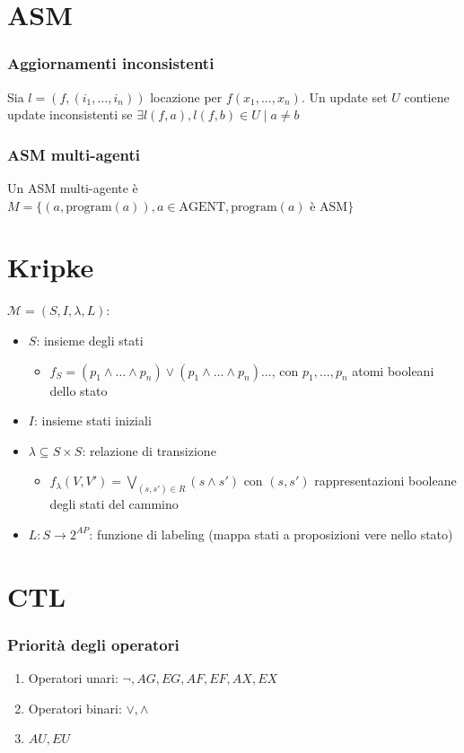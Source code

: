 \documentclass{article}
\begin{document}
\section*{ASM}

\subsubsection*{Aggiornamenti inconsistenti}
Sia $l=(f, (i_1, \dots, i_n))$ locazione per $f(x_1, \dots, x_n)$. Un update set $U$ contiene update inconsistenti se $\exists l(f, a), l(f,b) \in U \mid a \neq b$

\subsubsection*{ASM multi-agenti}
Un ASM multi-agente è $M = \{ (a, \text{program}(a)), a \in \text{AGENT}, \text{program}(a) \text{ è ASM} \}$

\section*{Kripke}
$\mathcal{M} = (S, I, \lambda, L)$:
\begin{itemize}
    \item $S$: insieme degli stati
    \begin{itemize}
        \item $f_S = (p_1 \land \dots \land p_n) \lor (p_1 \land \dots \land p_n) \dots$, con $p_1, \dots, p_n$ atomi booleani dello stato
    \end{itemize}
    \item $I$: insieme stati iniziali
    \item $\lambda \subseteq S \times S$: relazione di transizione
    \begin{itemize}
        \item $f_\lambda(V, V') = \bigvee_{(s, s') \in R} (s \land s')$ con $(s, s')$ rappresentazioni booleane degli stati del cammino
    \end{itemize}
    \item $L: S \to 2^{AP}$: funzione di labeling (mappa stati a proposizioni vere nello stato)
\end{itemize}

\section*{CTL}

\subsubsection*{Priorità degli operatori}
\begin{enumerate}
    \item Operatori unari: $\neg, AG, EG, AF, EF, AX, EX$
    \item Operatori binari: $\lor, \land$
    \item $AU, EU$
\end{enumerate}
\end{document}
